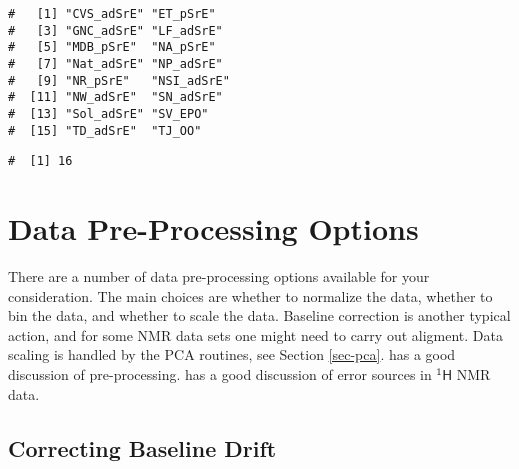 \documentclass[letter,10pt,twocolumn,twoside,printwatermark=false]{pinp}
\begin{document}
\begin{Shaded}
\begin{Highlighting}[]
\OperatorTok{$}
\end{Highlighting}
\end{Shaded}

\begin{ShadedResult}
\begin{verbatim}
#   [1] "CVS_adSrE" "ET_pSrE"  
#   [3] "GNC_adSrE" "LF_adSrE" 
#   [5] "MDB_pSrE"  "NA_pSrE"  
#   [7] "Nat_adSrE" "NP_adSrE" 
#   [9] "NR_pSrE"   "NSI_adSrE"
#  [11] "NW_adSrE"  "SN_adSrE" 
#  [13] "Sol_adSrE" "SV_EPO"   
#  [15] "TD_adSrE"  "TJ_OO"
\end{verbatim}
\end{ShadedResult}

\begin{Shaded}
\begin{Highlighting}[]
\NormalTok{(}\OperatorTok{$}
\end{Highlighting}
\end{Shaded}

\begin{ShadedResult}
\begin{verbatim}
#  [1] 16
\end{verbatim}
\end{ShadedResult}

\hypertarget{data-pre-processing-options}{%
\section{Data Pre-Processing
Options}\label{data-pre-processing-options}}

There are a number of data pre-processing options available for your
consideration. The main choices are whether to normalize the data,
whether to bin the data, and whether to scale the data. Baseline
correction is another typical action, and for some NMR data sets one
might need to carry out aligment. Data scaling is handled by the PCA
routines, see Section \ref{sec-pca}. \cite{Engel2013} has a good
discussion of pre-processing. \cite{Karakach2009} has a good discussion
of error sources in \(\mathsf{^{1}H}\) NMR data.

\hypertarget{correcting-baseline-drift}{%
\subsection{Correcting Baseline Drift}\label{correcting-baseline-drift}}
\end{document}
